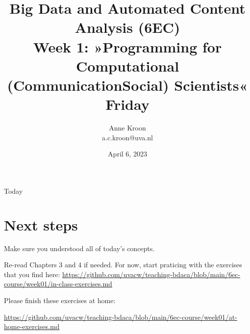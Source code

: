 

\graphicspath{{../../resources/img/}}




\title[Big Data and Automated Content Analysis]{\textbf{Big Data and Automated Content Analysis (6EC)} 
\\Week 1: »Programming for Computational (Communication\textbar Social) Scientists«
\\Friday }
\author[Anne Kroon]{Anne Kroon\\ \footnotesize{a.c.kroon@uva.nl}}
\date{April 6, 2023}

\begin{frame}{}
	\titlepage
\end{frame}

\begin{frame}{Today}
	\tableofcontents
\end{frame}






\section{Next steps}


\begin{frame}[standout]
Make sure you understood all of today's concepts.

Re-read Chapters 3 and 4 if needed.
For now, start praticing with the exercises that you find here:
\large{\url{https://github.com/uvacw/teaching-bdaca/blob/main/6ec-course/week01/in-class-exercises.md}}

Please finish these exercises at home: 

\large{\url{https://github.com/uvacw/teaching-bdaca/blob/main/6ec-course/week01/at-home-exercises.md}}
\end{frame}


\begin{frame}
	\printbibliography
\end{frame}


